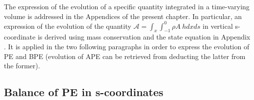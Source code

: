 The expression of the evolution of a specific quantity integrated in a time-varying volume is addressed in the Appendices  of the present chapter. In particular, an expression of the evolution of the quantity 
$\mathcal{A}=\int_x\int_{-1}^0\rho A\ hdx ds$
in vertical s-coordinate is derived using mass conservation and the state equation in Appendix . It is applied in the two following paragraphs in order to express the evolution of PE and BPE (evolution of APE can be retrieved from deducting the latter from the former).


\subsection{Balance of PE in s-coordinates}

